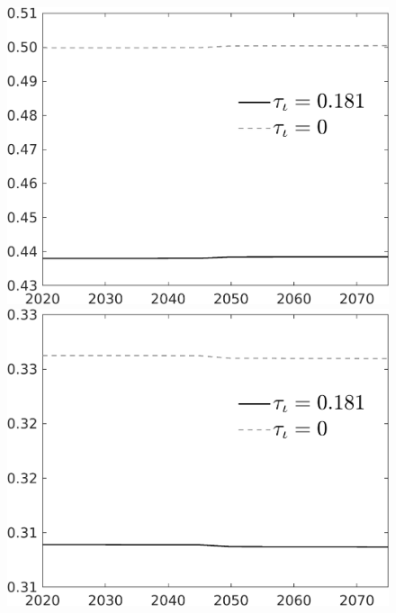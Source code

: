 \documentclass[12pt]{article}
\begin{document}
\begin{figure}[h!!]
\begin{minipage}[]{0.32\textwidth}
	\end{minipage}
	\begin{minipage}[]{0.32\textwidth}
		\includegraphics[width=1\textwidth]{../../codding_model/own_basedOnFried/optimalPol_010922_revision/figures/all_13Sept22/CompTauf_bytaul_Reg0_hh_spillover0_nsk0_xgr1_knspil0_sep1_LFlimit1_emsbase0_countec0_GovRev0_etaa0.79_lgd1.png}
	\end{minipage}	
	\begin{minipage}[]{0.32\textwidth}
		\includegraphics[width=1\textwidth]{../../codding_model/own_basedOnFried/optimalPol_010922_revision/figures/all_13Sept22/CompTauf_bytaul_Reg0_hl_spillover0_nsk0_xgr1_knspil0_sep1_LFlimit1_emsbase0_countec0_GovRev0_etaa0.79_lgd1.png}

\end{minipage}
\end{figure}
\end{document}
